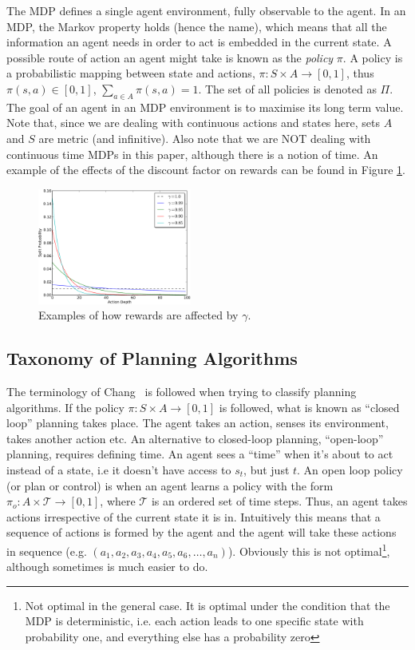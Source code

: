 \documentclass[conference]{IEEEtran}
\begin{document}
The MDP defines a single agent environment, fully observable to the agent. In an MDP, the Markov property holds (hence the name), which means that all the information an agent needs in order to act is embedded in the current state.
A possible route of action an agent might take is known as the \textit{policy} $\pi$. A policy is a probabilistic mapping between state and actions, $\pi:S \times A \rightarrow [0,1]$, thus $\pi(s,a) \in [0,1]$,  $\sum\limits_{a\in A}{\pi(s,a)} = 1$. The set of all policies is denoted as $\Pi$. The goal of an agent in an MDP environment is to maximise its long term value. Note that, since we are dealing with continuous actions and states here, sets $A$ and $S$ are metric (and infinitive). Also note that we are NOT dealing with continuous time MDPs in this paper, although there is a notion of time. An example of the effects of the discount factor on rewards can be found in Figure \ref{fig:gamma}.



\begin{figure}[ht]
  \centering
  \includegraphics[width=0.45\textwidth]{graphics/gamma-crop.pdf}
  \caption{Examples of how rewards are affected by $\gamma$.}
  \label{fig:gamma}
\end{figure}


\subsection{Taxonomy of Planning Algorithms}
The terminology of Chang~\cite{chang2007simulation} is followed when trying to classify planning algorithms. If the policy $\pi:S \times A \rightarrow [0,1]$ is followed, what is known as ``closed loop'' planning takes place. The agent takes an action, senses its environment, takes another action etc. An alternative to closed-loop planning, ``open-loop'' planning, requires defining time. An agent sees a ``time'' when it's about to act instead of a state, i.e it doesn't have access to $s_t$, but just $t$. An open loop policy (or plan or control) is when an agent learns a policy with the form $\pi_o:A \times \mathcal{T} \rightarrow [0,1]$, where  $\mathcal{T}$ is an ordered set of time steps. Thus, an agent takes actions irrespective of the current state it is in. Intuitively this means that a sequence of actions is formed by the agent and the agent will take these actions in sequence (e.g. $(a_1,a_2,a_3,a_4,a_5,a_6,\dots,a_n)$). Obviously this is not optimal\footnote{Not optimal in the general case. It is optimal under the condition that the MDP is deterministic, i.e. each action leads to one specific state with probability one, and everything else has a probability zero}, although sometimes is much easier to do.
\end{document}
